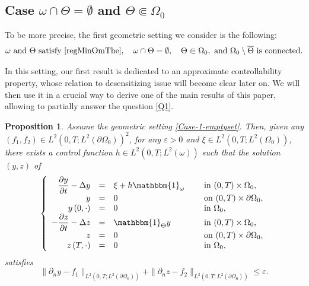 \documentclass[JEP,XML,SOM,Unicode,NoFloatCountersInSection]{cedram}
\newcounter{question}
\newtheorem{proposition}[theorem]{Proposition}
\theoremstyle{definition}
\begin{document}
\subsection*{Case \texorpdfstring{$\omega \cap \Theta = \emptyset$ and $\Theta \Subset \Omega_0$}{caseo}}

To be more precise, the first geometric setting we consider is the following:
\begin{equation}
\label{Case-1-emptyset}
\omega\text{ and }\Theta\text{ satisfy }\eqref{regMinOmThe},\quad
\omega \cap \Theta = \emptyset,
\quad \Theta \Subset \Omega_0,
\text{ and } \Omega_0 \setminus \overline\Theta \text{ is connected}.
\end{equation}

In this setting, our first result is dedicated to an approximate controllability property, whose relation to desensitizing issue will become clear later on. We will then use it in a crucial way to derive one of the main results of this paper, allowing to partially answer the question \ref{Q1}.

\begin{proposition}
\label{Prop-Approx-Cont-Case1}
Assume the geometric setting \eqref{Case-1-emptyset}. Then, given any $(f_1, f_2) \in L^2(0,T; L^2(\partial \Omega_0))^2$, for any $\varepsilon >0$ and $\xi \in L^2(0,T; L^2(\Omega_0))$, there exists a control function $h \in L^2(0,T; L^2(\omega))$ such that the solution $(y,z)$ of
\begin{equation}
\label{Coupled-Heat-Approx}
\left\{
\begin{array}{rcll}
\dfrac{\partial y}{\partial t}-\Delta y &=&\xi +h\mathbbm{1}_{\omega}\quad&\text{ in }(0,T) \times \Omega_0,
\\
y &=& 0 &\text{ on }(0,T) \times \partial \Omega_0,
\\
y\left(0,\cdot\right) &=& 0 &\text{ in }\Omega_0,
\\
-\dfrac{\partial z}{\partial t}-\Delta z &=&\mathbbm{1}_{\Theta}y &\text{ in }(0,T) \times \Omega_0,
\\
z &=& 0 &\text{ on }(0,T) \times \partial \Omega_0,
\\
z\left(T,\cdot\right) &=& 0 &\text{ in }\Omega_0,
\end{array}
\right.
\end{equation}
satisfies
\begin{equation}
\label{Approx-Cont}
\| \partial_n y - f_1 \|_{L^2(0,T; L^2(\partial\Omega_0))}
+
\| \partial_n z - f_2 \|_{L^2(0,T; L^2(\partial\Omega_0))}
\leq
\varepsilon.
\end{equation}
\end{proposition}
\end{document}
